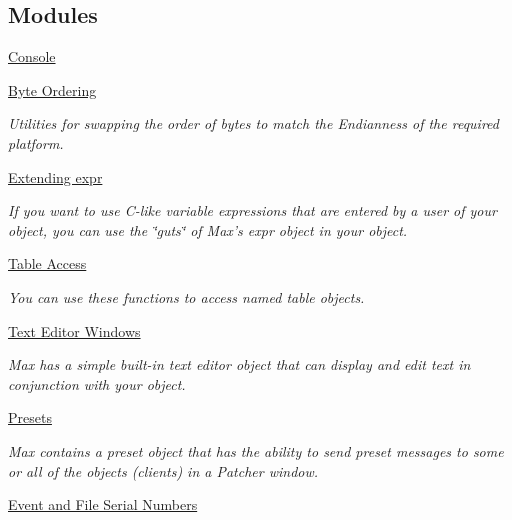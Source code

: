\subsection*{Modules}
\begin{DoxyCompactItemize}
\item 
\hyperlink{group__console}{Console}
\item 
\hyperlink{group__byteorder}{Byte Ordering}


\begin{DoxyCompactList}\small\item\em Utilities for swapping the order of bytes to match the Endianness of the required platform. \item\end{DoxyCompactList}\item 
\hyperlink{group__expr}{Extending expr}


\begin{DoxyCompactList}\small\item\em If you want to use C-\/like variable expressions that are entered by a user of your object, you can use the \char`\"{}guts\char`\"{} of Max’s expr object in your object. \item\end{DoxyCompactList}\item 
\hyperlink{group__tables}{Table Access}


\begin{DoxyCompactList}\small\item\em You can use these functions to access named table objects. \item\end{DoxyCompactList}\item 
\hyperlink{group__texteditors}{Text Editor Windows}


\begin{DoxyCompactList}\small\item\em Max has a simple built-\/in text editor object that can display and edit text in conjunction with your object. \item\end{DoxyCompactList}\item 
\hyperlink{group__presets}{Presets}


\begin{DoxyCompactList}\small\item\em Max contains a preset object that has the ability to send preset messages to some or all of the objects (clients) in a Patcher window. \item\end{DoxyCompactList}\item 
\hyperlink{group__evnum}{Event and File Serial Numbers}



\end{DoxyCompactItemize}
